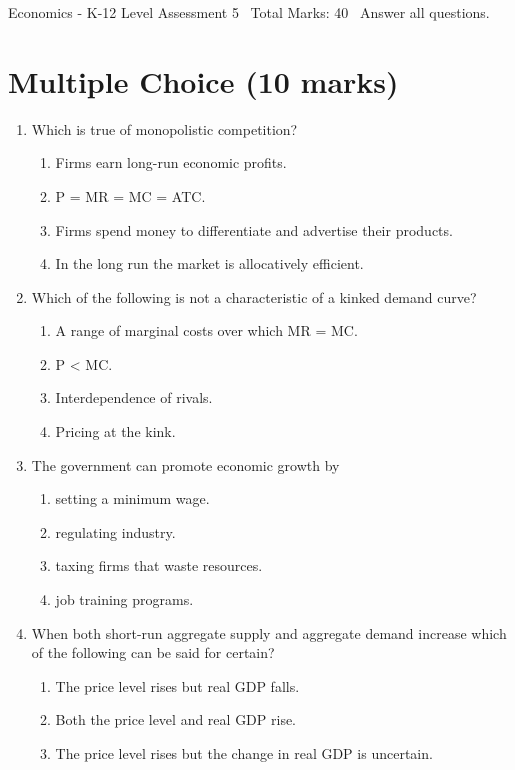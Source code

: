 \documentclass[12pt]{article}
\begin{document}
\begin{center}
Economics - K-12 Level Assessment 5 \
Total Marks: 40 \
Answer all questions.
\end{center}

\section*{Multiple Choice (10 marks)}
\begin{enumerate}[label=\arabic*.]
\item Which is true of monopolistic competition?
\begin{enumerate}[label=(\alph*)]
    \item Firms earn long-run economic profits.
    \item P = MR = MC = ATC.
    \item Firms spend money to differentiate and advertise their products.
    \item In the long run the market is allocatively efficient.
\end{enumerate}
\item Which of the following is not a characteristic of a kinked demand curve?
\begin{enumerate}[label=(\alph*)]
    \item A range of marginal costs over which MR = MC.
    \item P \textless{} MC.
    \item Interdependence of rivals.
    \item Pricing at the kink.
\end{enumerate}
\item The government can promote economic growth by
\begin{enumerate}[label=(\alph*)]
    \item setting a minimum wage.
    \item regulating industry.
    \item taxing firms that waste resources.
    \item job training programs.
\end{enumerate}
\item When both short-run aggregate supply and aggregate demand increase which of the following
can be said for certain?
\begin{enumerate}[label=(\alph*)]
    \item The price level rises but real GDP falls.
    \item Both the price level and real GDP rise.
    \item The price level rises but the change in real GDP is uncertain.

\end{enumerate}
\end{enumerate}
\end{document}
